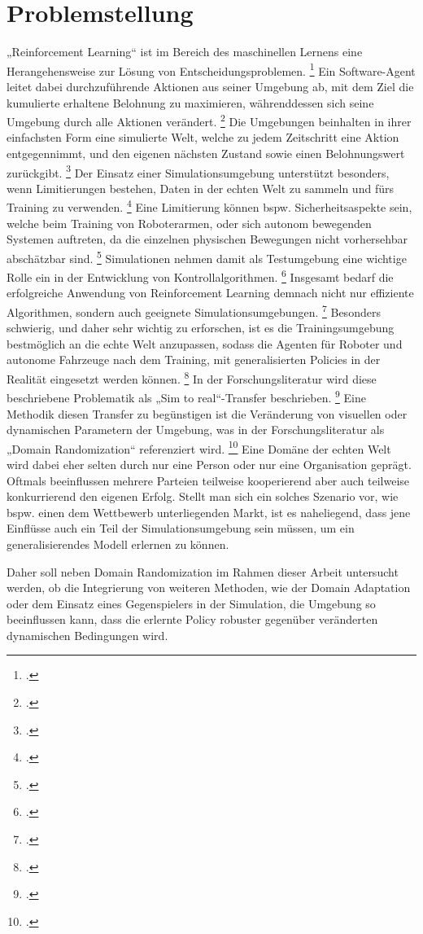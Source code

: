 \section{Problemstellung}

„Reinforcement Learning“ ist im Bereich des maschinellen Lernens eine Herangehensweise zur Lösung von Entscheidungsproblemen. \footcite[Vgl.][S. 3]{Schuderer.2021}
Ein Software-Agent leitet dabei durchzuführende Aktionen aus seiner Umgebung ab, mit dem Ziel die kumulierte erhaltene Belohnung zu maximieren, währenddessen sich seine Umgebung durch alle Aktionen verändert. \footcite[Vgl.][S. 3]{Schuderer.2021}
Die Umgebungen beinhalten in ihrer einfachsten Form eine simulierte Welt, welche zu jedem Zeitschritt eine Aktion entgegennimmt, und den eigenen nächsten Zustand sowie einen Belohnungswert zurückgibt. \footcite[Vgl.][S. 1]{Reda.2020}
Der Einsatz einer Simulationsumgebung unterstützt besonders, wenn Limitierungen bestehen, Daten in der echten Welt zu sammeln und fürs Training zu verwenden. \footcite[Vgl.][S. 737]{Zhao.2020}
Eine Limitierung können bspw. Sicherheitsaspekte sein, welche beim Training von Roboterarmen, oder sich autonom bewegenden Systemen auftreten, da die einzelnen physischen Bewegungen nicht vorhersehbar abschätzbar sind. \footcite[Vgl.][S. 738]{Zhao.2020}
Simulationen nehmen damit als Testumgebung eine wichtige Rolle ein in der Entwicklung von Kontrollalgorithmen. \footcite[Vgl.][S. 2]{Cutler.2014}
Insgesamt bedarf die erfolgreiche Anwendung von Reinforcement Learning demnach nicht nur effiziente Algorithmen, sondern auch geeignete Simulationsumgebungen. \footcite[Vgl.][S. 8]{Reda.2020}
Besonders schwierig, und daher sehr wichtig zu erforschen, ist es die Trainingsumgebung bestmöglich an die echte Welt anzupassen, sodass die Agenten für Roboter und autonome Fahrzeuge nach dem Training, mit generalisierten Policies in der Realität eingesetzt werden können. \footcite[Vgl.][S. 1]{DBLP:journals/corr/abs-1910-10537}
In der Forschungsliteratur wird diese beschriebene Problematik als „Sim to real“-Transfer beschrieben. \footcite[Vgl.][S. 738]{Zhao.2020}
Eine Methodik diesen Transfer zu begünstigen ist die Veränderung von visuellen oder dynamischen Parametern der Umgebung, was in der Forschungsliteratur als „Domain Randomization“ referenziert wird. \footcite[Vgl.][S. 2]{DBLP:journals/corr/abs-1910-10537}
Eine Domäne der echten Welt wird dabei eher selten durch nur eine Person oder nur eine Organisation geprägt. 
Oftmals beeinflussen mehrere Parteien teilweise kooperierend aber auch teilweise konkurrierend den eigenen Erfolg. 
Stellt man sich ein solches Szenario vor, wie bspw. einen dem Wettbewerb unterliegenden Markt, ist es naheliegend, dass jene Einflüsse auch ein Teil der Simulationsumgebung sein müssen, um ein generalisierendes Modell erlernen zu können.

Daher soll neben Domain Randomization im Rahmen dieser Arbeit untersucht werden, ob die Integrierung von weiteren Methoden, wie der Domain Adaptation oder dem Einsatz eines Gegenspielers in der Simulation, die Umgebung so beeinflussen kann, dass die erlernte Policy robuster gegenüber veränderten dynamischen Bedingungen wird. 
